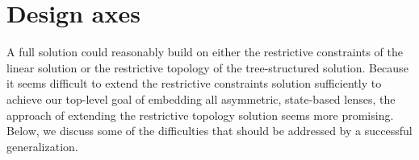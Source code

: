 %
%
%
%

\section{Design axes}
\label{sec:design_axes}
A full solution could reasonably build on either the restrictive constraints
of the linear solution
or the restrictive topology of the tree-structured solution. Because it seems
difficult to extend the restrictive constraints solution sufficiently to
achieve our top-level goal of embedding all asymmetric, state-based lenses,
the approach of extending the restrictive topology solution seems more
promising. Below, we discuss some of the difficulties that should be addressed
by a successful generalization.

